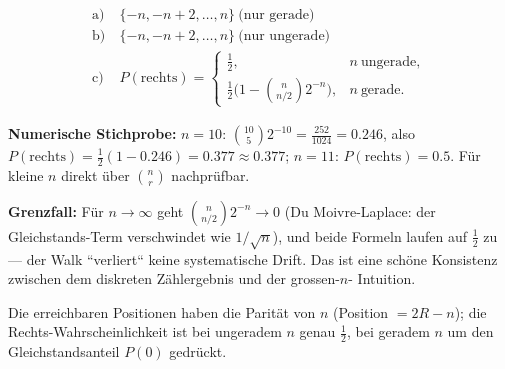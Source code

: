 \begin{ergebnis}
\begin{align*}
  \text{a)}&\ \{-n,-n+2,\dots,n\}\ \text{(nur gerade)}\\
  \text{b)}&\ \{-n,-n+2,\dots,n\}\ \text{(nur ungerade)}\\
  \text{c)}&\ P(\text{rechts})=
     \begin{cases}\frac12,& n\ \text{ungerade},\\
     \frac12\bigl(1-\binom{n}{n/2}2^{-n}\bigr),& n\ \text{gerade}.\end{cases}
\end{align*}
\end{ergebnis}

\begin{kontrolle}
\textbf{Numerische Stichprobe:} $n=10$: $\binom{10}{5}2^{-10}
=\frac{252}{1024}=0.246$, also $P(\text{rechts})=\frac12(1-0.246)
=0.377\approx0.377$; $n=11$: $P(\text{rechts})=0.5$. Für kleine $n$ direkt
über $\binom{n}{r}$ nachprüfbar.

\textbf{Grenzfall:} Für $n\to\infty$ geht $\binom{n}{n/2}2^{-n}\to0$
(Du Moivre-Laplace: der Gleichstands-Term verschwindet wie
$1/\sqrt{n}$), und beide Formeln laufen auf $\tfrac12$ zu --- der
Walk ``verliert`` keine systematische Drift. Das ist eine schöne
Konsistenz zwischen dem diskreten Zählergebnis und der grossen-$n$-
Intuition.
\end{kontrolle}

\begin{merksatz}
Die erreichbaren Positionen haben die Parität von $n$ (Position $=2R-n$);
die Rechts-Wahrscheinlichkeit ist bei ungeradem $n$ genau $\tfrac12$, bei
geradem $n$ um den Gleichstandsanteil $P(0)$ gedrückt.
\end{merksatz}
